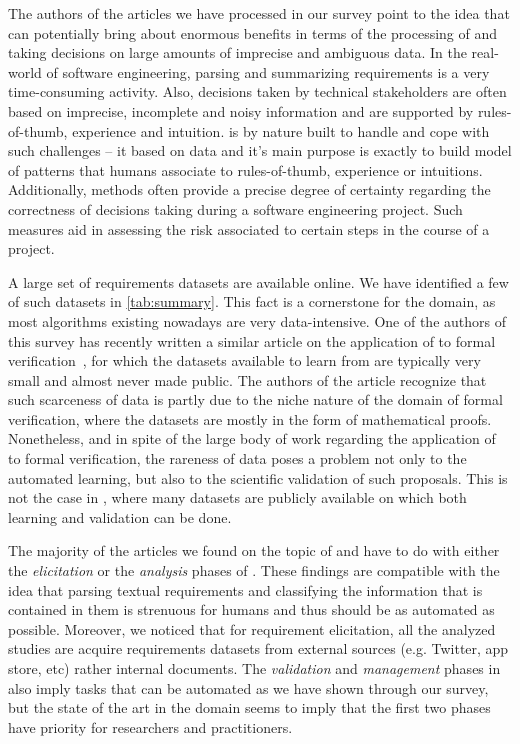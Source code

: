 The authors of the articles we have processed in our survey point to the idea
that \ML can potentially bring about enormous benefits in terms of the
processing of and taking decisions on large amounts of imprecise and ambiguous
data. In the real-world of software engineering, parsing and summarizing requirements is
a very time-consuming activity. Also, decisions taken by technical stakeholders
are often based on imprecise, incomplete and noisy information and are supported
by rules-of-thumb, experience and intuition. \ML is by nature built to handle
and cope with such challenges -- it based on data and it's main purpose is
exactly to build model of patterns that humans associate to rules-of-thumb,
experience or intuitions. Additionally, \ML methods often provide a precise
degree of certainty regarding the correctness of decisions taking during a
software engineering project. Such measures aid in assessing the risk associated
to certain steps in the course of a project.

A large set of requirements datasets are available online. We have
identified a few of such datasets in \tab \ref{tab:summary}. This fact is a cornerstone for the domain, as most \ML
algorithms existing nowadays are very data-intensive. One of the authors of this
survey has recently written a similar article on the application of \ML to
formal verification~\cite{AmLuBi:2018}, for which the datasets available
to learn from are typically very small and almost never made public. The authors
of the article recognize that such scarceness of data is partly due to the niche
nature of the domain of formal verification, where the datasets are mostly in
the form of mathematical proofs. Nonetheless, and in spite of the large body of
work regarding the application of \ML to formal verification, the rareness of
data poses a problem not only to the automated learning, but also to the
scientific validation of such proposals. This is not the case in \RE, where many
datasets are publicly available on which both learning and validation can be
done.

The majority of the articles we found on the topic of \ML and \RE have to do
with either the \emph{elicitation} or the \emph{analysis} phases of \RE. These
findings are compatible with the idea that parsing textual requirements  and
classifying the information that is contained in them is strenuous for humans
and thus should be as automated as possible. Moreover, we noticed that for
requirement elicitation, all the analyzed studies are acquire requirements datasets from external sources (e.g. Twitter, app store,
etc) rather internal documents. The \emph{validation} and \emph{management}
phases in \RE also imply tasks that can be automated as we have shown through our survey,
but the state of the art in the domain seems to imply that the first two phases
have priority for researchers and practitioners.

